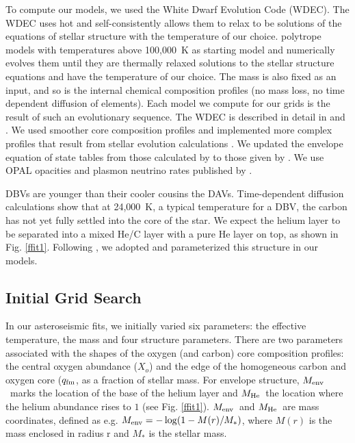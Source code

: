 \documentclass[12pt,preprint]{aastex}
\newcommand{\menv}{$M_{\rm env}$}
\newcommand{\mhe}{$M_{\rm He}$}
\newcommand{\xo}{$X_o$}
\newcommand{\qfm}{$q_{\rm fm}$}
\begin{document}
To compute our models, we used the White Dwarf Evolution Code (WDEC). The WDEC uses hot  and self-consistently allows them to relax to be solutions of the equations of stellar structure with the temperature of our choice.
polytrope models with temperatures above 100{,}000~K as starting model and numerically evolves them until they are thermally relaxed 
solutions to the stellar structure equations and have the temperature of our choice. The mass is also fixed as an input, and so is the internal chemical composition profiles (no mass loss, no time dependent diffusion of elements). Each model we compute for our grids is the result 
of such an evolutionary sequence. The WDEC is described in detail in \citet{Lamb75} and 
\citet{Wood90}. We used smoother core composition profiles and implemented more complex profiles 
that result from stellar evolution calculations \citep{Salaris97}. We updated the envelope 
equation of state tables from those calculated by \citet{Fontaine77} to those given by 
\citet{Saumon95}. We use OPAL opacities \citep{Iglesias96} and plasmon neutrino rates 
published by \citet{Itoh96}. 

DBVs are younger than their cooler cousins the DAVs. Time-dependent diffusion calculations 
\citep[e.g.][]{Dehner95,Althaus05} show that at 24{,}000~K, a typical temperature for a DBV, 
the carbon has not yet fully settled into the core of the star. We expect the helium layer to 
be separated into a mixed He/C layer with a pure He layer on top, as shown in Fig. \ref{ffit1}. 
Following \citet{Metcalfe05a}, we adopted and parameterized this structure in our models. 

\subsection{Initial Grid Search}
\label{grids}

In our asteroseismic fits, we initially varied six parameters: the effective temperature, 
the mass and four structure parameters. There are two parameters associated with the shapes 
of the oxygen (and carbon) core composition profiles: the central oxygen abundance (\xo) and 
the edge of the homogeneous carbon and oxygen core (\qfm, as a fraction of stellar mass. 
For envelope structure, \menv\ marks the location of the base of the helium layer 
and \mhe\ the location where the helium abundance rises to $1$ (see Fig. \ref{ffit1}). 
\menv\ and \mhe\ are mass coordinates, defined as e.g. $M_{\rm env} = -\log(1 - M(r)/M_*)$, 
where $M(r)$ is the mass enclosed in radius r and $M_*$ is the stellar mass. 
\end{document}
